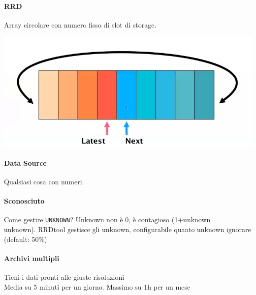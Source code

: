 \documentclass[10pt]{book}
\begin{document}
\paragraph{RRD} Array circolare con numero fisso di slot di storage.
\begin{center}
	\includegraphics[scale=0.7]{rrdtool_rr.png}
\end{center}
\paragraph{Data Source} Qualsiasi cosa con numeri.
\paragraph{Sconosciuto} Come gestire \texttt{UNKNOWN}? Unknown non è 0, è contagioso (1+unknown = unknown). RRDtool gestisce gli unknown, configurabile quanto unknown ignorare (default: 50\%)
\paragraph{Archivi multipli} Tieni i dati pronti alle giuste risoluzioni\\
Media su 5 minuti per un giorno.
Massimo su 1h per un mese
\end{document}
